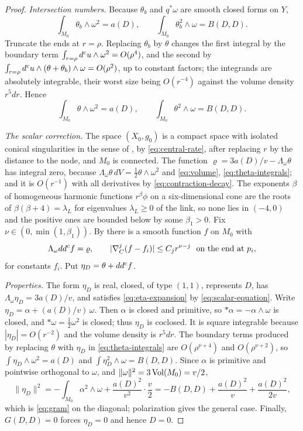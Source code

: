 \begin{proof}
\emph{Intersection numbers.} Because $\theta_b$ and $q^*\omega$ are smooth
closed forms on $Y$,
\[
 \int_{M_0}\theta_b\wedge\omega^2=a(D),\qquad
 \int_{M_0}\theta_b^2\wedge\omega=B(D,D).
\]
Truncate the ends at $r=\rho$. Replacing $\theta_b$ by $\theta$ changes
the first integral by the boundary term $\int_{r=\rho}d^c u\wedge\omega^2
=O(\rho^4)$, and the second by $\int_{r=\rho}d^c u\wedge(\theta+\theta_b)
\wedge\omega=O(\rho^2)$, up to constant factors; the integrands are
absolutely integrable, their worst size being $O(r^{-4})$ against the
volume density $r^5dr$. Hence
\begin{equation}\label{eq:theta-integrals}
 \int_{M_0}\theta\wedge\omega^2=a(D),\qquad
 \int_{M_0}\theta^2\wedge\omega=B(D,D).
\end{equation}

\emph{The scalar correction.} The space $(X_0,g_0)$ is a compact space
with isolated conical singularities in the sense of
\cite[Definition~2.1]{joyce}, by \eqref{eq:central-rate}, after replacing $r$ by the distance to the
node, and $M_0$ is connected. The function
$\varrho=3a(D)/v-\Lambda_\omega\theta$ has integral zero, because
$\Lambda_\omega\theta\,dV=\tfrac12\theta\wedge\omega^2$ and
\eqref{eq:volume}, \eqref{eq:theta-integrals}; and it is $O(r^{-1})$ with
all derivatives by \eqref{eq:contraction-decay}. The exponents $\beta$ of
homogeneous harmonic functions $r^\beta\phi$ on a six-dimensional cone are
the roots of $\beta(\beta+4)=\lambda_L$ for eigenvalues $\lambda_L\ge0$ of the
link, so none
lies in $(-4,0)$ and the positive ones are bounded below by some $\beta_1>0$. Fix $\nu\in(0,\min(1,\beta_1))$. By
\cite[Proposition~2.18 and Theorem~2.9]{joyce} there is a smooth function
$f$ on $M_0$ with
\begin{equation}\label{eq:scalar-equation}
 \Lambda_\omega dd^c f=\varrho,\qquad
 |\nabla_C^j(f-f_i)|\le C_jr^{\nu-j}\ \text{ on the end at }p_i,
\end{equation}
for constants $f_i$. Put $\eta_D=\theta+dd^c f$.

\emph{Properties.} The form $\eta_D$ is real, closed, of type $(1,1)$,
represents $D$, has $\Lambda_\omega\eta_D=3a(D)/v$, and satisfies
\eqref{eq:eta-expansion} by \eqref{eq:scalar-equation}. Write
$\eta_D=\alpha+(a(D)/v)\,\omega$. Then $\alpha$ is closed and primitive,
so $*\alpha=-\alpha\wedge\omega$ is closed, and $*\omega=\tfrac12\omega^2$
is closed; thus $\eta_D$ is coclosed. It is square integrable because
$|\eta_D|=O(r^{-2})$ and the volume density is $r^5dr$. The boundary
terms produced by replacing $\theta$ with $\eta_D$ in
\eqref{eq:theta-integrals} are $O(\rho^{\nu+4})$ and $O(\rho^{\nu+2})$, so
$\int\eta_D\wedge\omega^2=a(D)$ and $\int\eta_D^2\wedge\omega=B(D,D)$.
Since $\alpha$ is primitive and pointwise orthogonal to $\omega$, and
$\|\omega\|^2=3\operatorname{Vol}(M_0)=v/2$,
\[
 \|\eta_D\|^2=-\int_{M_0}\alpha^2\wedge\omega+\frac{a(D)^2}{v^2}\cdot
 \frac v2=-B(D,D)+\frac{a(D)^2}{v}+\frac{a(D)^2}{2v},
\]
which is \eqref{eq:gram} on the diagonal; polarization gives the general
case. Finally, $G(D,D)=0$ forces $\eta_D=0$ and hence $D=0$.
\end{proof}

